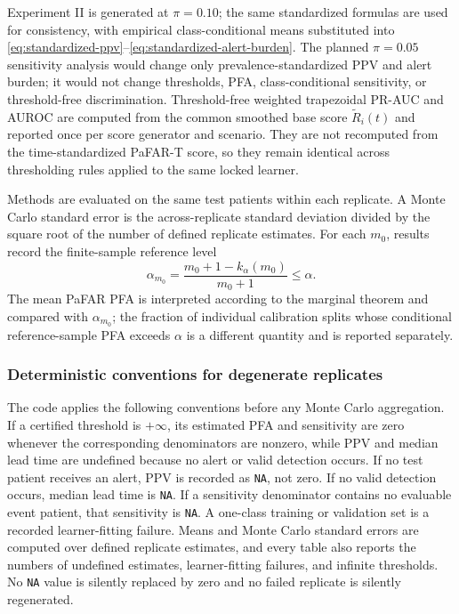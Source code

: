 \documentclass[11pt]{article}
\begin{document}
Experiment II is generated at $\pi=0.10$; the same standardized formulas are used for consistency, with empirical class-conditional means substituted into \eqref{eq:standardized-ppv}--\eqref{eq:standardized-alert-burden}. The planned $\pi=0.05$ sensitivity analysis would change only prevalence-standardized PPV and alert burden; it would not change thresholds, PFA, class-conditional sensitivity, or threshold-free discrimination. Threshold-free weighted trapezoidal PR-AUC and AUROC are computed from the common smoothed base score $\widetilde R_i(t)$ and reported once per score generator and scenario. They are not recomputed from the time-standardized PaFAR-T score, so they remain identical across thresholding rules applied to the same locked learner.

Methods are evaluated on the same test patients within each replicate. A Monte Carlo standard error is the across-replicate standard deviation divided by the square root of the number of defined replicate estimates. For each $m_0$, results record the finite-sample reference level
\[
\alpha_{m_0}=\frac{m_0+1-k_{\alpha}(m_0)}{m_0+1}\le\alpha.
\]
The mean PaFAR PFA is interpreted according to the marginal theorem and compared with $\alpha_{m_0}$; the fraction of individual calibration splits whose conditional reference-sample PFA exceeds $\alpha$ is a different quantity and is reported separately.

\subsubsection*{Deterministic conventions for degenerate replicates}
The code applies the following conventions before any Monte Carlo aggregation. If a certified threshold is $+\infty$, its estimated PFA and sensitivity are zero whenever the corresponding denominators are nonzero, while PPV and median lead time are undefined because no alert or valid detection occurs. If no test patient receives an alert, PPV is recorded as \texttt{NA}, not zero. If no valid detection occurs, median lead time is \texttt{NA}. If a sensitivity denominator contains no evaluable event patient, that sensitivity is \texttt{NA}. A one-class training or validation set is a recorded learner-fitting failure. Means and Monte Carlo standard errors are computed over defined replicate estimates, and every table also reports the numbers of undefined estimates, learner-fitting failures, and infinite thresholds. No \texttt{NA} value is silently replaced by zero and no failed replicate is silently regenerated.
\end{document}
